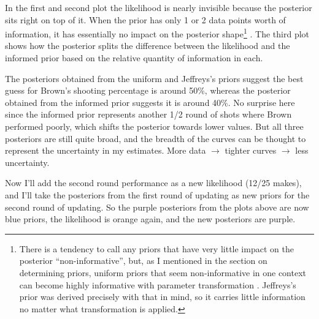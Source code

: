 \FloatBarrier

In the first and second plot the likelihood is nearly invisible because the posterior sits right on top of it. When the prior has only 1 or 2 data points worth of information, it has essentially no impact on the posterior shape\footnote{There is a tendency to call any priors that have very little impact on the posterior ``non-informative'', but, as I mentioned in the section on determining priors, uniform priors that seem non-informative in one context can become highly informative with parameter transformation \cite{MuZhuLu2004}. Jeffreys's prior was derived precisely with that in mind, so it carries little information no matter what transformation is applied.} . The third plot shows how the posterior splits the difference between the likelihood and the informed prior based on the relative quantity of information in each.

The posteriors obtained from the uniform and Jeffreys's priors suggest the best guess for Brown's shooting percentage is around 50\%, whereas the posterior obtained from the informed prior suggests it is around 40\%. No surprise here since the informed prior represents another 1/2 round of shots where Brown performed poorly, which shifts the posterior towards lower values. But all three posteriors are still quite broad, and the breadth of the curves can be thought to represent the uncertainty in my estimates. More data $\rightarrow$ tighter curves $\rightarrow$ less uncertainty.

Now I'll add the second round performance as a new likelihood (12/25 makes), and I'll take the posteriors from the first round of updating as new priors for the second round of updating. So the purple posteriors from the plots above are now blue priors, the likelihood is orange again, and the new posteriors are purple.



